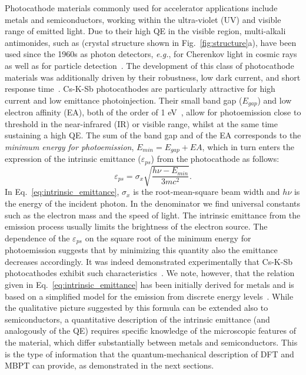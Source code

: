 \documentclass[aps,pra,superscriptaddress,twocolumn]{revtex4}
\begin{document}
Photocathode materials commonly used for accelerator applications include metals and semiconductors, working within the ultra-violet (UV) and visible range of emitted light. 
Due to their high QE in the visible region, multi-alkali antimonides, such as  (crystal structure shown in Fig.~\ref{fig:structure}a), have been used since the 1960s as photon detectors, \textit{e.g.}, for Cherenkov light in cosmic rays as well as for particle detection~\cite{somm56iretns}.
The development of this class of photocathode materials was additionally driven by their robustness, low dark current, and short response time~\cite{musu+18nimpra}.
Cs-K-Sb photocathodes are particularly attractive for high current and low emittance photoinjection. 
Their small band gap ($E_{gap}$) and low electron affinity (EA), both of the order of 1 eV~\cite{nath-mee67ije,ghos-varm78jap}, allow for photoemission close to threshold in the near-infrared (IR) or visible range, whilst at the same time sustaining a high QE.
The sum of the band gap and of the EA corresponds to the \textit{minimum energy for photoemission}, $E_{min}=E_{gap} + EA$, which in turn enters the expression of the intrinsic emittance ($\varepsilon_{ps}$) from the photocathode as follows:
%
\begin{equation}
\varepsilon_{ps}=\sigma_{x} \sqrt{\frac{h\nu - E_{min}}{3mc^{2}}}.
\label{eq:intrinsic_emittance}
\end{equation}
%
In Eq.~\eqref{eq:intrinsic_emittance}, $\sigma_{x}$ is the root-mean-square beam width and $h\nu$ is the energy of the incident photon. 
In the denominator we find universal constants such as the electron mass and the speed of light.
The intrinsic emittance from the emission process usually limits the brightness of the electron source.
The dependence of the $\varepsilon_{ps}$ on the square root of the minimum energy for photoemission suggests that by minimizing this quantity also the emittance decreases accordingly. 
It was indeed demonstrated experimentally that Cs-K-Sb photocathodes exhibit such characteristics~\cite{vecc+11apl}.
We note, however, that the relation given in Eq.~\eqref{eq:intrinsic_emittance} has been initially derived for metals and is based on a simplified model for the emission from discrete energy levels~\cite{berg-spic64pr,dowe-schm09prab}. 
While the qualitative picture suggested by this formula can be extended also to semiconductors, a quantitative description of the intrinsic emittance (and analogously of the QE) requires specific knowledge of the microscopic features of the material, which differ substantially between metals and semiconductors.
This is the type of information that the quantum-mechanical description of DFT and MBPT can provide, as demonstrated in the next sections.
\end{document}
